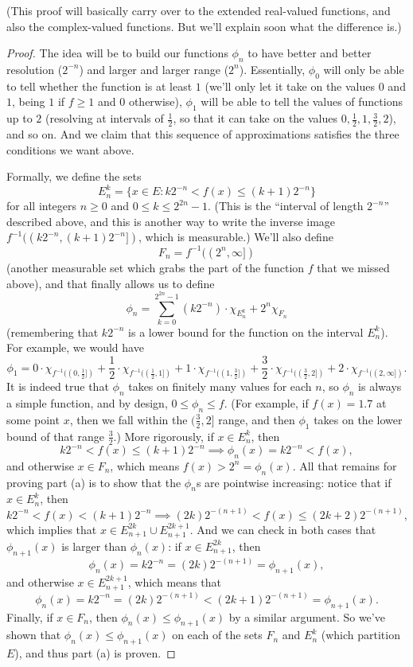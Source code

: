 (This proof will basically carry over to the extended real-valued functions, and also the complex-valued functions. But we'll explain soon what the difference is.)

\begin{proof}
The idea will be to build our functions $\phi_n$ to have better and better resolution ($2^{-n}$) and larger and larger range ($2^n$). Essentially, $\phi_0$ will only be able to tell whether the function is at least $1$ (we'll only let it take on the values $0$ and $1$, being $1$ if $f \ge 1$ and $0$ otherwise), $\phi_1$ will be able to tell the values of functions up to $2$ (resolving at intervals of $\frac{1}{2}$, so that it can take on the values $0, \frac{1}{2}, 1, \frac{3}{2}, 2$), and so on. And we claim that this sequence of approximations satisfies the three conditions we want above.

Formally, we define the sets
\[
    E_n^k = \{x \in E: k2^{-n} < f(x) \le (k+1) 2^{-n}\}
\]
for all integers $n \ge 0$ and $0 \le k \le 2^{2n} - 1$. (This is the ``interval of length $2^{-n}$'' described above, and this is another way to write the inverse image $f^{-1}((k 2^{-n}, (k+1)2^{-n}])$, which is measurable.) We'll also define 
\[
    F_n = f^{-1}((2^n, \infty])
\]
(another measurable set which grabs the part of the function $f$ that we missed above), and that finally allows us to define 
\[
    \phi_n = \sum_{k=0}^{2^{2n} - 1} (k2^{-n}) \cdot \chi_{E_n^k} + 2^n \chi_{F_n}
\]
(remembering that $k2^{-n}$ is a lower bound for the function on the interval $E_n^k$). For example, we would have
\[
    \phi_1 = 0 \cdot \chi_{f^{-1}((0, \frac{1}{2}])} + \frac{1}{2} \cdot \chi_{f^{-1}((\frac{1}{2}, 1])} + 1 \cdot \chi_{f^{-1}((1, \frac{3}{2}])} + \frac{3}{2} \cdot \chi_{f^{-1}((\frac{3}{2}, 2])} + 2 \cdot \chi_{f^{-1}((2, \infty])}.
\]
It is indeed true that $\phi_n$ takes on finitely many values for each $n$, so $\phi_n$ is always a simple function, and by design, $0 \le \phi_n \le f$. (For example, if $f(x) = 1.7$ at some point $x$, then we fall within the $(\frac{3}{2}, 2]$ range, and then $\phi_1$ takes on the lower bound of that range $\frac{3}{2}$.) More rigorously, if $x \in E_n^k$, then 
\[
    k2^{-n} < f(x) \le (k+1) 2^{-n} \implies \phi_n(x) = k2^{-n} < f(x),
\]
and otherwise $x \in F_n$, which means $f(x) > 2^n = \phi_n(x)$. All that remains for proving part (a) is to show that the $\phi_n$s are pointwise increasing: notice that if $x \in E_n^k$, then
\[
    k2^{-n} < f(x) < (k+1)2^{-n} \implies (2k) 2^{-(n+1)} < f(x) \le (2k+2) 2^{-(n+1)}, 
\]
which implies that $x \in E_{n+1}^{2k} \cup E_{n+1}^{2k+1}$. And we can check in both cases that $\phi_{n+1}(x)$ is larger than $\phi_n(x)$: if $x \in E_{n+1}^{2k}$, then 
\[
    \phi_n(x) = k2^{-n} = (2k) 2^{-(n+1)} = \phi_{n+1}(x),
\]
and otherwise $x \in E_{n+1}^{2k+1}$, which means that 
\[
    \phi_n(x) = k2^{-n} = (2k) 2^{-(n+1)} < (2k+1) 2^{-(n+1)} = \phi_{n+1}(x).
\]
Finally, if $x \in F_n$, then $\phi_n(x) \le \phi_{n+1}(x)$ by a similar argument. So we've shown that $\phi_n(x) \le \phi_{n+1}(x)$ on each of the sets $F_n$ and $E_n^k$ (which partition $E$), and thus part (a) is proven. 


\end{proof}
